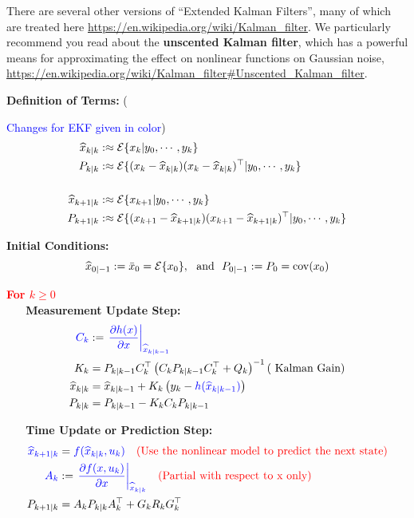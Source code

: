 There are several other versions of ``Extended Kalman Filters'', many of which are treated here \url{https://en.wikipedia.org/wiki/Kalman_filter}. We particularly recommend you read about the \textbf{unscented Kalman filter}, which has a powerful means for approximating the effect on nonlinear functions on Gaussian noise, \url{https://en.wikipedia.org/wiki/Kalman_filter#Unscented_Kalman_filter}.

\textbf{Definition of Terms:} ({\textcolor{blue}{Changes for EKF given in color})
\begin{align*}
\widehat{x}_{k|k} &:\approx {\cal E} \{ x_k | y_0, \cdots, y_k \}\\
P_{k|k} &:\approx{\cal E} \{ (x_k-\widehat{x}_{k|k})(x_k-\widehat{x}_{k|k})^\top | y_0, \cdots, y_k \}\\
& \\
\widehat{x}_{k+1|k} &:\approx {\cal E} \{  x_{k+1}  |  y_0, \cdots, y_k \}\\
P_{k+1|k}&:\approx {\cal E} \{ (x_{k+1}-\widehat{x}_{k+1|k})(x_{k+1}-\widehat{x}_{k+1|k})^\top | y_0, \cdots, y_k \}\\
\end{align*}

\textbf{Initial Conditions:}
$$\widehat{x}_{0|-1} :=\bar{x}_0 = {\cal E} \{ x_0 \},~~\mbox{and}~~P_{0|-1}:=P_0=\mathrm{cov}(x_0)  $$

\textcolor{red}{\bf For $k \ge 0$}\\

\textbf{~~~Measurement Update Step:}
\begin{align*}
\color{blue}{ {C}_k }&:= \color{blue}{ \left. \frac{\partial h(x)}{\partial x} \right|_{ \widehat{x}_{k|k-1} } }\\
K_k &= P_{k|k-1}C_k^\top \left(C_k P_{k|k-1} C_k^\top + Q_k\right)^{-1} (\text{  Kalman Gain})\\
\widehat{x}_{k|k} &= \widehat{x}_{k|k-1}  + K_k \left( y_k -  {\color{blue} h(\widehat{x}_{k|k-1})} \right) \\
P_{k|k} &= P_{k|k-1} - K_k C_k  P_{k|k-1}
\end{align*}

\textbf{~~~Time Update or Prediction Step:}
\begin{align*}
\color{blue}\widehat{x}_{k+1|k} &= \color{blue}f( \widehat{x}_{k|k}, u_k) ~~~\text{\color{red}(Use the nonlinear model to predict the next state)} \\
\color{blue}{A_k}&:=\color{blue}{\left. \frac{\partial f(x,u_k)}{\partial x}\right|_{\widehat{x}_{k|k}}}~~~\text{\color{red}(Partial with respect to x only)}\\
P_{k+1|k} &= A_k P_{k|k} A_k^\top + G_k R_k G_k^\top
\end{align*}

}

